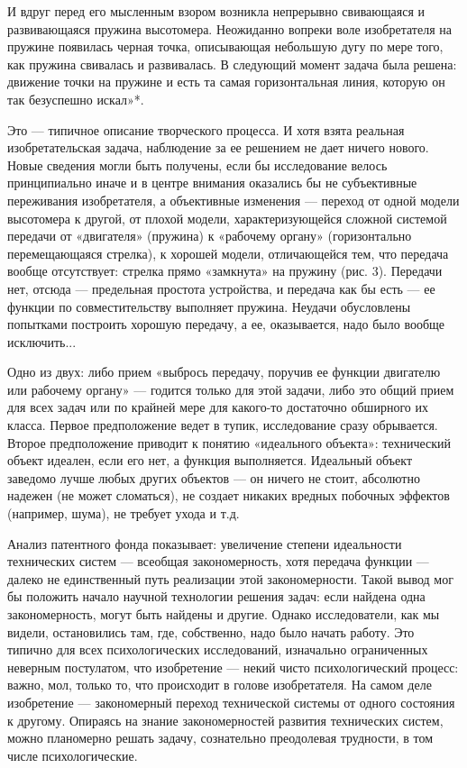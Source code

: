 И вдруг перед  его мысленным взором возникла  непрерывно свивающаяся и
развивающаяся пружина высотомера. Неожиданно вопреки воле изобретателя
на пружине появилась черная точка,  описывающая небольшую дугу по мере
того, как пружина  свивалась и развивалась. В  следующий момент задача
была решена: движение точки на  пружине и есть та самая горизонтальная
линия, которую он так безуспешно искал»*.

Это —  типичное описание творческого  процесса. И хотя  взята реальная
изобретательская  задача, наблюдение  за  ее решением  не дает  ничего
нового.  Новые  сведения могли  быть  получены,  если бы  исследование
велось  принципиально  иначе  и  в центре  внимания  оказались  бы  не
субъективные  переживания  изобретателя,  а  объективные  изменения  —
переход  от  одной  модели  высотомера к  другой,  от  плохой  модели,
характеризующейся сложной системой передачи от «двигателя» (пружина) к
«рабочему  органу» (горизонтально  перемещающаяся стрелка),  к хорошей
модели,  отличающейся тем,  что передача  вообще отсутствует:  стрелка
прямо  «замкнута»  на  пружину  (рис.   3).  Передачи  нет,  отсюда  —
предельная простота устройства, и передача как бы есть — ее функции по
совместительству  выполняет  пружина.  Неудачи  обусловлены  попытками
построить  хорошую  передачу,  а  ее, оказывается,  надо  было  вообще
исключить...

Одно  из  двух:  либо  прием «выбрось  передачу,  поручив  ее  функции
двигателю или рабочему органу» —  годится только для этой задачи, либо
это  общий прием  для всех  задач или  по крайней  мере для  какого-то
достаточно обширного  их класса.  Первое предположение ведет  в тупик,
исследование сразу обрывается. Второе предположение приводит к понятию
«идеального  объекта»: технический  объект  идеален, если  его нет,  а
функция  выполняется. Идеальный  объект  заведомо  лучше любых  других
объектов — он ничего не стоит, абсолютно надежен (не может сломаться),
не  создает никаких  вредных  побочных эффектов  (например, шума),  не
требует ухода и т.д.

Анализ  патентного фонда  показывает:  увеличение степени  идеальности
технических систем — всеобщая  закономерность, хотя передача функции —
далеко  не единственный  путь  реализации  этой закономерности.  Такой
вывод мог  бы положить начало  научной технологии решения  задач: если
найдена  одна  закономерность, могут  быть  найдены  и другие.  Однако
исследователи, как мы видели,  остановились там, где, собственно, надо
было начать работу. Это типично для всех психологических исследований,
изначально ограниченных  неверным постулатом, что изобретение  — некий
чисто психологический процесс: важно, мол, только то, что происходит в
голове изобретателя. На самом  деле изобретение — закономерный переход
технической  системы  от  одного  состояния  к  другому.  Опираясь  на
знание закономерностей  развития технических систем,  можно планомерно
решать  задачу,   сознательно  преодолевая  трудности,  в   том  числе
психологические.


